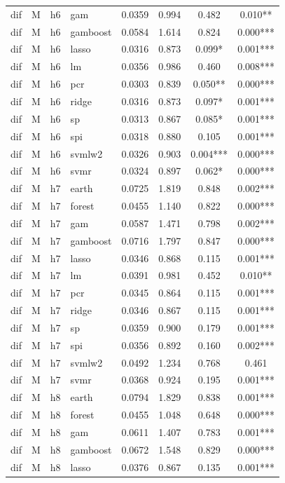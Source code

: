 \begin{ThreePartTable}
\begin{longtable}[t]{llclcccc}
dif & M & h6 & gam & 0.0359 & 0.994 & 0.482 & 0.010**\\
dif & M & h6 & gamboost & 0.0584 & 1.614 & 0.824 & 0.000***\\
dif & M & h6 & lasso & 0.0316 & 0.873 & 0.099* & 0.001***\\
dif & M & h6 & lm & 0.0356 & 0.986 & 0.460 & 0.008***\\
dif & M & h6 & pcr & 0.0303 & 0.839 & 0.050** & 0.000***\\
dif & M & h6 & ridge & 0.0316 & 0.873 & 0.097* & 0.001***\\
dif & M & h6 & sp & 0.0313 & 0.867 & 0.085* & 0.001***\\
dif & M & h6 & spi & 0.0318 & 0.880 & 0.105 & 0.001***\\
dif & M & h6 & svmlw2 & 0.0326 & 0.903 & 0.004*** & 0.000***\\
dif & M & h6 & svmr & 0.0324 & 0.897 & 0.062* & 0.000***\\
\addlinespace
dif & M & h7 & earth & 0.0725 & 1.819 & 0.848 & 0.002***\\
dif & M & h7 & forest & 0.0455 & 1.140 & 0.822 & 0.000***\\
dif & M & h7 & gam & 0.0587 & 1.471 & 0.798 & 0.002***\\
dif & M & h7 & gamboost & 0.0716 & 1.797 & 0.847 & 0.000***\\
dif & M & h7 & lasso & 0.0346 & 0.868 & 0.115 & 0.001***\\
dif & M & h7 & lm & 0.0391 & 0.981 & 0.452 & 0.010**\\
dif & M & h7 & pcr & 0.0345 & 0.864 & 0.115 & 0.001***\\
dif & M & h7 & ridge & 0.0346 & 0.867 & 0.115 & 0.001***\\
dif & M & h7 & sp & 0.0359 & 0.900 & 0.179 & 0.001***\\
dif & M & h7 & spi & 0.0356 & 0.892 & 0.160 & 0.002***\\
dif & M & h7 & svmlw2 & 0.0492 & 1.234 & 0.768 & 0.461\\
dif & M & h7 & svmr & 0.0368 & 0.924 & 0.195 & 0.001***\\
\addlinespace
dif & M & h8 & earth & 0.0794 & 1.829 & 0.838 & 0.001***\\
dif & M & h8 & forest & 0.0455 & 1.048 & 0.648 & 0.000***\\
dif & M & h8 & gam & 0.0611 & 1.407 & 0.783 & 0.001***\\
dif & M & h8 & gamboost & 0.0672 & 1.548 & 0.829 & 0.000***\\
dif & M & h8 & lasso & 0.0376 & 0.867 & 0.135 & 0.001***\\

\end{longtable}
\end{ThreePartTable}
